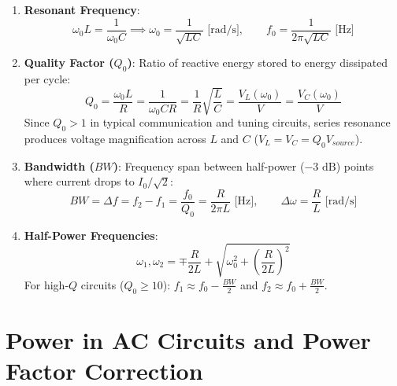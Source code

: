 \begin{theorem}
\begin{enumerate}
    \item \textbf{Resonant Frequency}:
    \begin{equation}
    \omega_0 L = \frac{1}{\omega_0 C} \implies \omega_0 = \frac{1}{\sqrt{LC}} \text{ [rad/s]}, \qquad f_0 = \frac{1}{2\pi\sqrt{LC}} \text{ [Hz]}
    \end{equation}
    \item \textbf{Quality Factor ($Q_0$)}: Ratio of reactive energy stored to energy dissipated per cycle:
    \begin{equation}
    Q_0 = \frac{\omega_0 L}{R} = \frac{1}{\omega_0 C R} = \frac{1}{R}\sqrt{\frac{L}{C}} = \frac{V_L(\omega_0)}{V} = \frac{V_C(\omega_0)}{V}
    \end{equation}
    Since $Q_0 > 1$ in typical communication and tuning circuits, series resonance produces voltage magnification across $L$ and $C$ ($V_L = V_C = Q_0 V_{source}$).
    \item \textbf{Bandwidth ($BW$)}: Frequency span between half-power ($-3\text{ dB}$) points where current drops to $I_0 / \sqrt{2}$:
    \begin{equation}
    BW = \Delta f = f_2 - f_1 = \frac{f_0}{Q_0} = \frac{R}{2\pi L} \text{ [Hz]}, \qquad \Delta \omega = \frac{R}{L} \text{ [rad/s]}
    \end{equation}
    \item \textbf{Half-Power Frequencies}:
    \begin{equation}
    \omega_1, \omega_2 = \mp \frac{R}{2L} + \sqrt{\omega_0^2 + \left(\frac{R}{2L}\right)^2}
    \end{equation}
    For high-$Q$ circuits ($Q_0 \ge 10$): $f_1 \approx f_0 - \frac{BW}{2}$ and $f_2 \approx f_0 + \frac{BW}{2}$.
\end{enumerate}
\end{theorem}

\section{Power in AC Circuits and Power Factor Correction}

